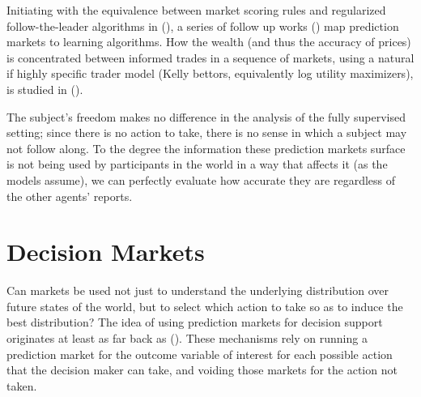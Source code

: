 

Initiating with the equivalence between market scoring rules and regularized follow-the-leader algorithms in (\cite{chen2010new}), a series of follow up works (\cite{abernethy2013efficient, frongillo2012interpreting, hu2014multi, frongillo2015convergence}) map prediction markets to learning algorithms. 
How the wealth (and thus the accuracy of prices) is concentrated between informed trades in a sequence of markets, using a natural if highly specific trader model (Kelly bettors, equivalently log utility maximizers), is studied in (\cite{beygelzimer2012learning}).

The subject's freedom makes no difference in the analysis of the fully supervised setting; since there is no action to take, there is no sense in which a subject may not follow along. To the degree the information these prediction markets surface is not being used by participants in the world in a way that affects it (as the models assume), we can perfectly evaluate how accurate they are regardless of the other agents' reports.


\section{Decision Markets}

Can markets be used not just to understand the underlying distribution over future states of the world, but to select which action to take so as to induce the best distribution? %
The idea of using prediction markets for decision support originates at least as far back as (\cite{berg2003prediction,hanson2002decision}). 
These mechanisms rely on running a prediction market for the outcome variable of interest for each possible action that the decision maker can take, and voiding those markets for the action not taken.

